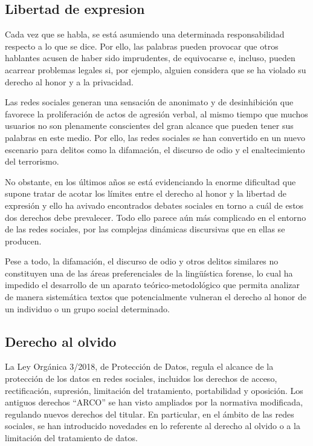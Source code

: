\subsection{Libertad de expresion}

Cada vez que se habla, se está asumiendo una determinada responsabilidad respecto a lo que se dice. Por ello, las palabras pueden provocar que otros hablantes acusen de haber sido imprudentes, de equivocarse e, incluso, pueden acarrear problemas legales si, por ejemplo, alguien considera que se ha violado su derecho al honor y a la privacidad.

Las redes sociales generan una sensación de anonimato y de desinhibición que favorece la proliferación de actos de agresión verbal, al mismo tiempo que muchos usuarios no son plenamente conscientes del gran alcance que pueden tener sus palabras en este medio. Por ello, las redes sociales se han convertido en un nuevo escenario para delitos como la difamación, el discurso de odio y el enaltecimiento del terrorismo.

No obstante, en los últimos años se está evidenciando la enorme dificultad que supone tratar de acotar los límites entre el derecho al honor y la libertad de expresión y ello ha avivado encontrados debates sociales en torno a cuál de estos dos derechos debe prevalecer. Todo ello parece aún más complicado en el entorno de las redes sociales, por las complejas dinámicas discursivas que en ellas se producen.

Pese a todo, la difamación, el discurso de odio y otros delitos similares no constituyen una de las áreas preferenciales de la lingüística forense, lo cual ha impedido el desarrollo de un aparato teórico-metodológico que permita analizar de manera sistemática textos que potencialmente vulneran el derecho al honor de un individuo o un grupo social determinado.

\subsection{Derecho al olvido}

La Ley Orgánica 3/2018, de Protección de Datos, regula el alcance de la protección de los datos en redes sociales, incluidos los derechos de acceso, rectificación, supresión, limitación del tratamiento, portabilidad y oposición. Los antiguos derechos “ARCO” se han visto ampliados por la normativa modificada, regulando nuevos derechos del titular. En particular, en el ámbito de las redes sociales, se han introducido novedades en lo referente al derecho al olvido o a la limitación del tratamiento de datos.

